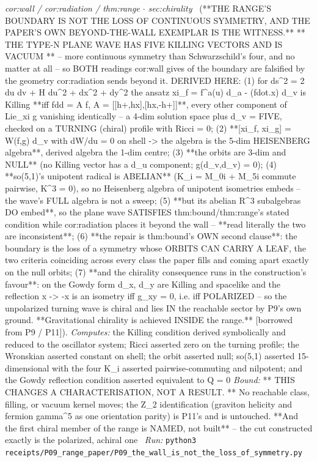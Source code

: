 \begin{description}
\textit{cor:wall / cor:radiation / thm:range \ensuremath{\cdot} sec:chirality} \ (**THE RANGE'S BOUNDARY IS NOT THE LOSS OF CONTINUOUS SYMMETRY, AND THE PAPER'S OWN BEYOND-THE-WALL EXEMPLAR IS THE WITNESS.** ** THE TYPE-N PLANE WAVE HAS FIVE KILLING VECTORS AND IS VACUUM ** -- more continuous symmetry than Schwarzschild's four, and no matter at all -- so BOTH readings cor:wall gives of the boundary are falsified by the geometry cor:radiation sends beyond it. DERIVED HERE: (1) for ds\textasciicircum{}2 = 2 du dv + H du\textasciicircum{}2 + dx\textasciicircum{}2 + dy\textasciicircum{}2 the ansatz xi\_f = f\textasciicircum{}a(u) d\_a - (fdot.x) d\_v is Killing **iff fdd = A f, A = [[h+,hx],[hx,-h+]]**, every other component of Lie\_xi g vanishing identically -- a 4-dim solution space plus d\_v = FIVE, checked on a TURNING (chiral) profile with Ricci = 0; (2) **[xi\_f, xi\_g] = W(f,g) d\_v with dW/du = 0 on shell -> the algebra is the 5-dim HEISENBERG algebra**, derived algebra the 1-dim centre; (3) **the orbits are 3-dim and NULL** (no Killing vector has a d\_u component; g(d\_v,d\_v) = 0); (4) **so(5,1)'s unipotent radical is ABELIAN** (K\_i = M\_0i + M\_5i commute pairwise, K\textasciicircum{}3 = 0), so no Heisenberg algebra of unipotent isometries embeds -- the wave's FULL algebra is not a sweep; (5) **but its abelian R\textasciicircum{}3 subalgebras DO embed**, so the plane wave SATISFIES thm:bound/thm:range's stated condition while cor:radiation places it beyond the wall -- **read literally the two are inconsistent**; (6) **the repair is thm:bound's OWN second clause**: the boundary is the loss of a symmetry whose ORBITS CAN CARRY A LEAF, the two criteria coinciding across every class the paper fills and coming apart exactly on the null orbits; (7) **and the chirality consequence runs in the construction's favour**: on the Gowdy form d\_x, d\_y are Killing and spacelike and the reflection x -> -x is an isometry iff g\_xy = 0, i.e. iff POLARIZED -- so the unpolarized turning wave is chiral and lies IN the reachable sector by P9's own ground. **Gravitational chirality is achieved INSIDE the range.** [borrowed from P9 / P11]). 
\emph{Computes:} the Killing condition derived symbolically and reduced to the oscillator system; Ricci asserted zero on the turning profile; the Wronskian asserted constant on shell; the orbit asserted null; so(5,1) asserted 15-dimensional with the four K\_i asserted pairwise-commuting and nilpotent; and the Gowdy reflection condition asserted equivalent to Q = 0
 \emph{Bound:} ** THIS CHANGES A CHARACTERISATION, NOT A RESULT. ** No reachable class, filling, or vacuum kernel moves; the Z\_2 identification (graviton helicity and fermion gamma\textasciicircum{}5 as one orientation parity) is P11's and is untouched. **And the first chiral member of the range is NAMED, not built** -- the cut constructed exactly is the polarized, achiral one
\ \emph{Run:} \texttt{python3 receipts/P09\_range\_paper/P09\_the\_wall\_is\_not\_the\_loss\_of\_symmetry.py}
\end{description}\endgroup
